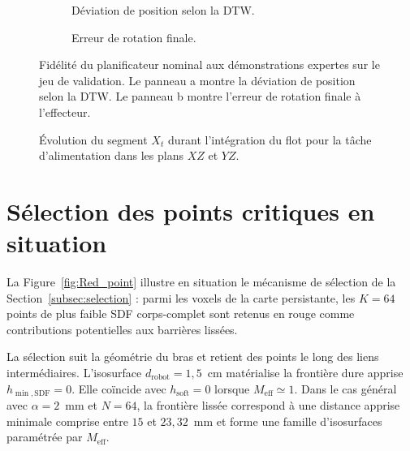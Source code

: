 \begin{figure}[htbp]
    \centering
    \begin{subfigure}[b]{0.48\textwidth}
        \centering
        
        \caption{Déviation de position selon la \ac{DTW}.}\label{fig:dist_err_dtw}
    \end{subfigure}
    \hfill
    \begin{subfigure}[b]{0.48\textwidth}
        \centering
        
        \caption{Erreur de rotation finale.}\label{fig:dist_err_rotation}
    \end{subfigure}
    \caption[Fidélité du planificateur nominal aux démonstrations]{Fidélité du planificateur nominal aux démonstrations expertes sur le jeu de validation. Le panneau a montre la déviation de position selon la \ac{DTW}. Le panneau b montre l'erreur de rotation finale à l'effecteur.}\label{fig:dist_err_FM}
\end{figure}
\begin{figure}[!htbp]
    \centering
    
    \caption[Évolution du déruitage durant l'intégration du flot]{Évolution du segment $X_t$ durant l'intégration du flot pour la tâche d'alimentation dans les plans $XZ$ et $YZ$.}\label{fig:denoising}
\end{figure}

\section*{Sélection des points critiques en situation}\label{subsec:res_points_critiques}
La Figure~\ref{fig:Red_point} illustre en situation le mécanisme de sélection de la Section~\ref{subsec:selection} : parmi les voxels de la carte persistante, les $K=64$ points de plus faible \ac{SDF} corps-complet sont retenus en rouge comme contributions potentielles aux barrières lissées.

La sélection suit la géométrie du bras et retient des points le long des liens intermédiaires. L'isosurface $d_{\mathrm{robot}}=1{,}5$~cm matérialise la frontière dure apprise $h_{\min,\mathrm{SDF}}=0$. Elle coïncide avec $h_{\mathrm{soft}}=0$ lorsque $M_{\mathrm{eff}}\simeq1$. Dans le cas général avec $\alpha=2$~mm et $N=64$, la frontière lissée correspond à une distance apprise minimale comprise entre $15$ et $23{,}32$~mm et forme une famille d'isosurfaces paramétrée par $M_{\mathrm{eff}}$.

